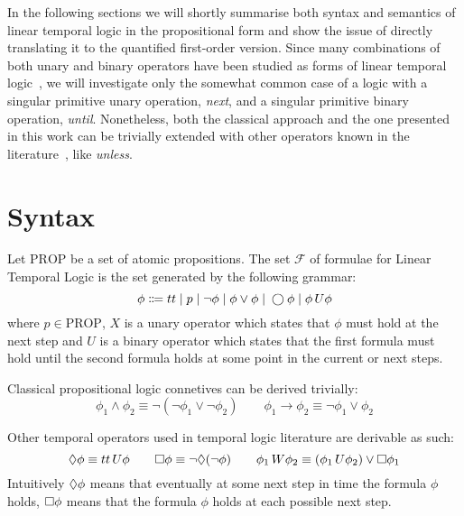 In the following sections we will shortly summarise both syntax and semantics of linear temporal logic in the
propositional form and show the issue of directly translating it to the quantified first-order version. Since many
combinations of both unary and binary operators have been studied as forms of linear temporal
logic~\cite{pnueli_temporal_1977,gabbay_temporal_1994}, we will investigate only the somewhat common case of a logic
with a singular primitive unary operation, \emph{next}, and a singular primitive binary operation, \emph{until}.
Nonetheless, both the classical approach and the one presented in this work can be trivially extended with other
operators known in the literature~\cite{kroger_temporal_2008}, like \emph{unless}.

\section{Syntax}

\begin{definition}
  Let $\text{PROP}$ be a set of atomic propositions. The set $\mathcal{F}$ of formulae for Linear Temporal Logic is the
  set generated by the following grammar:
  \[
    \phi \Coloneqq tt \;|\; p
                      \;|\; \neg\phi
                      \;|\; \phi \lor \phi
                      \;|\; \bigcirc{\phi}
                      \;|\; {\phi}\,U {\phi}
  \]
  where $p \in \text{PROP}$, $X$ is a unary operator which states that $\phi$ must hold at the next step and $U$ is a
  binary operator which states that the first formula must hold until the second formula holds at some point in the
  current or next steps.
\end{definition}

Classical propositional logic connetives can be derived trivially:
\[
  \phi_1 \land \phi_2 \equiv \neg(\neg\phi_1 \lor \neg\phi_2) \qquad
  \phi_1 \to \phi_2 \equiv \neg\phi_1 \lor \phi_2
\]

Other temporal operators used in temporal logic literature are derivable as such:
\[
  \Diamond{\phi} \equiv {tt}\,U {\phi} \qquad
  \Box{\phi} \equiv \neg\Diamond{(}\neg\phi) \qquad
  {\phi_1}\,W {\phi_2} \equiv ({\phi_1}\,U {\phi_2}) \lor \Box{\phi_1}
\]
Intuitively $\Diamond{\phi}$ means that eventually at some next step in time the formula $\phi$ holds,
$\Box{\phi}$ means that the formula $\phi$ holds at each possible next step.

